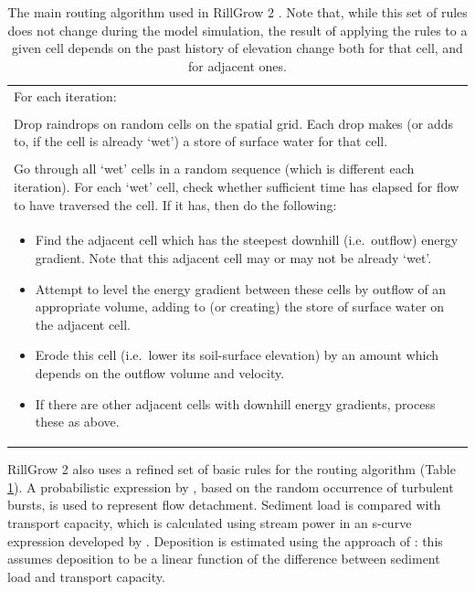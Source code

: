 \begin{table}[htb]
  \centering
  \small
  \caption[The main routing algorithm used in RillGrow 2]{The main routing
algorithm used in RillGrow 2 \citep[From][]{favis2000-2173}. Note that, while
this set of rules does not change during the model simulation, the result of
applying the rules to a given cell depends on the past history of elevation
change both for that cell, and for adjacent ones.}
  \label{tab:TheMainRoutingAlgorithmUsedInRillGrow2}
    \begin{tabular}{p{}}
    \toprule
For each iteration:\\
\\
Drop raindrops on random cells on the spatial grid. Each drop makes (or adds to,
if the cell is already `wet') a store of surface water for that cell.\\
\\
Go through all `wet' cells in a random sequence (which is different each
iteration). For each `wet' cell, check whether sufficient time has elapsed for
flow to have traversed the cell. If it has, then do the following:\\
\begin{itemize}
  \item Find the adjacent cell which has the steepest downhill (i.e.\
outflow) energy gradient. Note that this adjacent cell may or may not be already
`wet'.
  \item Attempt to level the energy gradient between these cells by
outflow of an appropriate volume, adding to (or creating) the store of surface
water on the adjacent cell.
  \item Erode this cell (i.e.\ lower its soil-surface elevation) by an
amount which depends on the outflow volume and velocity.
  \item If there are other adjacent cells with downhill energy gradients,
process these as above.
\end{itemize}\\
    \bottomrule
    \end{tabular}
\end{table}

RillGrow 2 also uses a refined set of basic rules for the routing algorithm
(Table \ref{tab:TheMainRoutingAlgorithmUsedInRillGrow2}). A probabilistic
expression by \citet{nearing1991-81}, based on the random occurrence of
turbulent bursts, is used to represent flow detachment. Sediment load is
compared with transport capacity, which is calculated using stream power in an
s-curve expression developed by \citet{nearing1997-865}. Deposition is estimated
using the approach of  \citet{lei1998-3157}: this assumes deposition to be a
linear function of the difference between sediment load and transport capacity.


